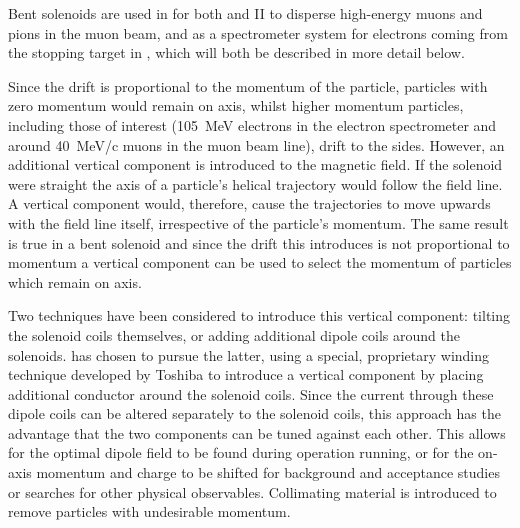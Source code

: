 Bent solenoids are used in \COMET for both \phaseI and II to disperse high-energy muons and pions in the muon
beam, and as a spectrometer system for electrons coming
from the stopping target in \phaseII, which will both be described in more
detail below.

Since the drift is proportional to the momentum of the particle, particles with zero momentum would remain on axis, whilst higher momentum particles, including those of interest (105~MeV electrons in the \phaseII electron spectrometer and around 40~MeV/c muons in the muon beam line), drift to the sides.  
However, an additional vertical component is introduced to the magnetic field.
If the solenoid were straight the axis of a particle's helical trajectory would follow the field line. 
A vertical component would, therefore, cause the trajectories to move upwards with the field line itself, irrespective of the particle's momentum.
The same result is true in a bent solenoid and since the drift this introduces is not proportional to momentum a vertical component can be used to select the momentum of particles which remain on axis.

Two techniques have been considered to introduce this vertical component: tilting the solenoid coils themselves, or adding additional dipole coils around the solenoids.
\COMET has chosen to pursue the latter, using a special, proprietary winding technique developed by Toshiba to introduce a vertical component by placing additional conductor around the solenoid coils.
Since the current through these dipole coils can be altered separately to the solenoid coils, this approach has the advantage that the two components can be tuned against each other.
This allows for the optimal dipole field to be found during operation running, or for the on-axis momentum and charge to be shifted for background and acceptance studies or searches for other physical observables.
Collimating material is introduced to remove particles with undesirable momentum.


